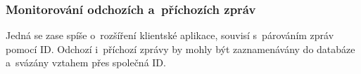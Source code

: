 \subsubsection{Monitorování odchozích a~příchozích zpráv}
Jedná se zase spíše o~rozšíření klientské aplikace, souvisí s~párováním zpráv pomocí ID. Odchozí i~příchozí zprávy by mohly být zaznamenávány do databáze a~svázány vztahem přes společná ID.

